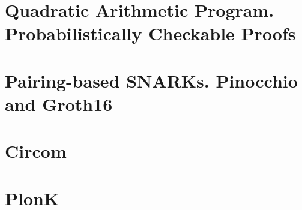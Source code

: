 \documentclass{zkdl-template}
\begin{document}
\label{section:circuits}

\section{Quadratic Arithmetic Program. Probabilistically Checkable Proofs}



\section{Pairing-based SNARKs. Pinocchio and Groth16}



\section{Circom}\label{section:circom}



\section{PlonK}\label{section:plonk}


\end{document}
